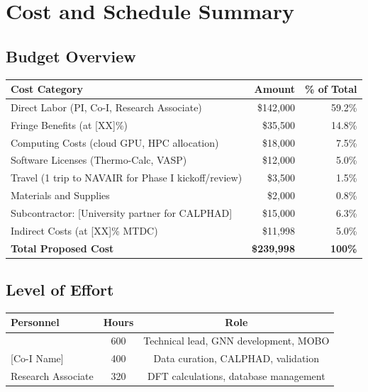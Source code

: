 \documentclass[11pt,letterpaper]{article}
\begin{document}
\section{Cost and Schedule Summary}
\label{sec:cost}

\subsection{Budget Overview}

\begin{center}
\begin{tabular}{lrr}
\toprule
\textbf{Cost Category} & \textbf{Amount} & \textbf{\% of Total} \\
\midrule
Direct Labor (PI, Co-I, Research Associate) & \$142,000 & 59.2\% \\
Fringe Benefits (at [XX]\%) & \$35,500 & 14.8\% \\
Computing Costs (cloud GPU, HPC allocation) & \$18,000 & 7.5\% \\
Software Licenses (Thermo-Calc, VASP) & \$12,000 & 5.0\% \\
Travel (1 trip to NAVAIR for Phase I kickoff/review) & \$3,500 & 1.5\% \\
Materials and Supplies & \$2,000 & 0.8\% \\
Subcontractor: [University partner for CALPHAD] & \$15,000 & 6.3\% \\
Indirect Costs (at [XX]\% MTDC) & \$11,998 & 5.0\% \\
\midrule
\textbf{Total Proposed Cost} & \textbf{\$239,998} & \textbf{100\%} \\
\bottomrule
\end{tabular}
\end{center}

\subsection{Level of Effort}

\begin{center}
\begin{tabular}{lcc}
\toprule
\textbf{Personnel} & \textbf{Hours} & \textbf{Role} \\
\midrule
[PI Name] & 600 & Technical lead, GNN development, MOBO \\
{[Co-I Name]} & 400 & Data curation, CALPHAD, validation \\
Research Associate & 320 & DFT calculations, database management \\
\bottomrule
\end{tabular}
\end{center}
\end{document}
